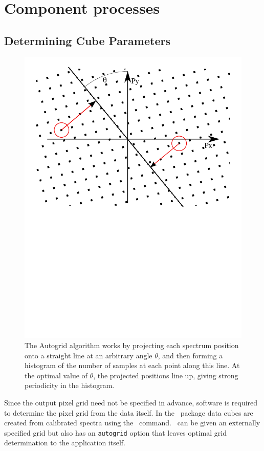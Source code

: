 \documentclass[final,authoryear,5p,times,twocolumn]{elsarticle}
\begin{document}
\section{Component processes}

\subsection{Determining Cube Parameters}
\label{sec:makecube}

\begin{figure}[t]
\includegraphics[width=\columnwidth]{autogrid}
\caption{The Autogrid algorithm works by projecting each spectrum
  position onto a straight line at an arbitrary angle $\theta$, and then
  forming a histogram of the number of samples at each point along
  this line. At the optimal value of $\theta$, the projected positions
  line up, giving strong periodicity in the histogram.}
\label{fig:autogrid}
\end{figure}

Since the output pixel grid need not be specified in advance, software
is required to determine the pixel grid from the data itself. In the
\smurf\ package data cubes are created from calibrated spectra using the
\makecube\ command. \makecube\ can be given an externally specified
grid but also has an \texttt{autogrid} option that leaves optimal grid
determination to the application itself.
\end{document}
